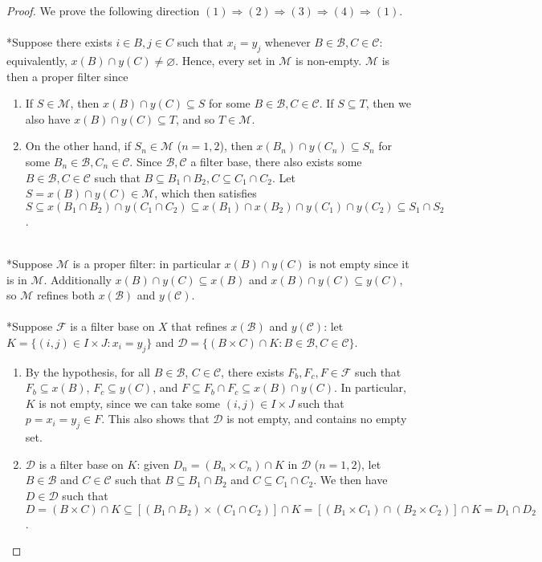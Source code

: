\documentclass{treatise}
\begin{document}
\begin{proof}
We prove the following direction $(1) \Rightarrow (2) \Rightarrow (3) \Rightarrow (4) \Rightarrow (1)$.
\\
\\
*Suppose there exists $i \in B, j \in C$ such that $x_i = y_j$ whenever $B \in \mathcal{B}, C \in \mathcal{C}$: equivalently, $x(B) \cap y(C) \neq \varnothing$. Hence, every set in $\mathcal{M}$ is non-empty. $\mathcal{M}$ is then a proper filter since
\begin{enumerate}
    \item If $S \in \mathcal{M}$, then $x(B) \cap y(C) \subseteq S$ for some $B \in \mathcal{B}, C \in \mathcal{C}$. If $S \subseteq T$, then we also have $x(B) \cap y(C) \subseteq T$, and so $T \in \mathcal{M}$.
    \item On the other hand, if $S_n \in \mathcal{M}$ ($n = 1, 2$), then $x(B_n) \cap y(C_n) \subseteq S_n$ for some $B_n \in \mathcal{B}, C_n \in \mathcal{C}$. Since $\mathcal{B}, \mathcal{C}$ a filter base, there also exists some $B \in \mathcal{B}, C \in \mathcal{C}$ such that $B \subseteq B_1 \cap B_2, C \subseteq C_1 \cap C_2$. Let $S = x(B) \cap y(C) \in \mathcal{M}$, which then satisfies $S \subseteq x(B_1 \cap B_2) \cap y(C_1 \cap C_2) \subseteq x(B_1) \cap x(B_2) \cap y(C_1) \cap y(C_2) \subseteq S_1 \cap S_2$.
\end{enumerate}
\ 
\\
*Suppose $\mathcal{M}$ is a proper filter: in particular $x(B) \cap y(C)$ is not empty since it is in $\mathcal{M}$. Additionally $x(B) \cap y(C) \subseteq x(B)$ and $x(B) \cap y(C) \subseteq y(C)$, so $\mathcal{M}$ refines both $x(\mathcal{B})$ and $y(\mathcal{C})$.
\\
\\
*Suppose $\mathcal{F}$ is a filter base on $X$ that refines $x(\mathcal{B})$ and $y(\mathcal{C})$: let $K = \{ (i, j) \in I \times J : x_i = y_j \}$ and $\mathcal{D} = \{ (B \times C) \cap K : B \in \mathcal{B}, C \in \mathcal{C} \}$.
\begin{enumerate}
    \item By the hypothesis, for all $B \in \mathcal{B}$, $C \in \mathcal{C}$, there exists $F_b, F_c, F \in \mathcal{F}$ such that $F_b \subseteq x(B)$, $F_c \subseteq y(C)$, and $F \subseteq F_b \cap F_c \subseteq x(B) \cap y(C)$. In particular, $K$ is not empty, since we can take some $(i, j) \in I \times J$ such that $p = x_i = y_j \in F$. This also shows that $\mathcal{D}$ is not empty, and contains no empty set.
    \item $\mathcal{D}$ is a filter base on $K$: given $D_n = (B_n \times C_n) \cap K$ in $\mathcal{D}$ ($n = 1, 2$), let $B \in \mathcal{B}$ and $C \in \mathcal{C}$ such that $B \subseteq B_1 \cap B_2$ and $C \subseteq C_1 \cap C_2$. We then have $D \in \mathcal{D}$ such that $D = (B \times C) \cap K \subseteq [(B_1 \cap B_2) \times (C_1 \cap C_2)] \cap K = [(B_1 \times C_1) \cap (B_2 \times C_2)] \cap K = D_1 \cap D_2$.

\end{enumerate}
\end{proof}
\end{document}
